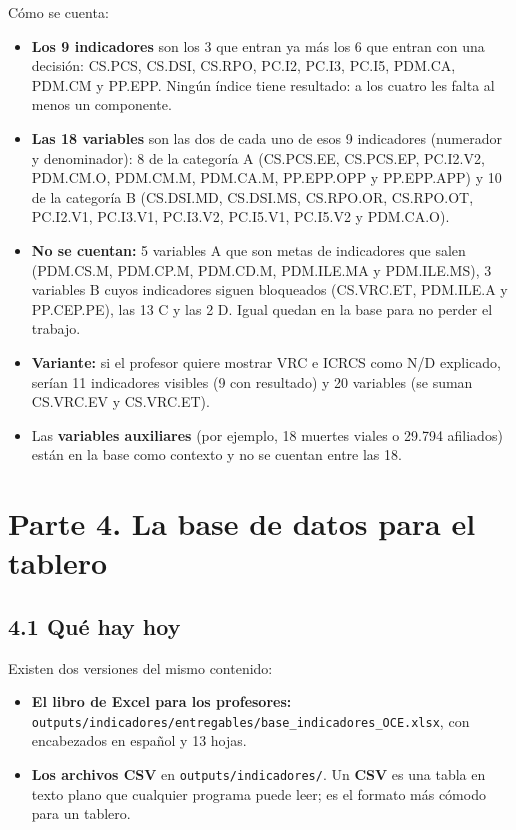 \documentclass[11pt,letterpaper]{article}
\begin{document}
Cómo se cuenta:

\begin{itemize}
\item \textbf{Los 9 indicadores} son los 3 que entran ya más los 6 que entran con una decisión: CS.PCS, CS.DSI, CS.RPO, PC.I2, PC.I3, PC.I5, PDM.CA, PDM.CM y PP.EPP. Ningún índice tiene resultado: a los cuatro les falta al menos un componente.
\item \textbf{Las 18 variables} son las dos de cada uno de esos 9 indicadores (numerador y denominador): 8 de la categoría A (CS.PCS.EE, CS.PCS.EP, PC.I2.V2, PDM.CM.O, PDM.CM.M, PDM.CA.M, PP.EPP.OPP y PP.EPP.APP) y 10 de la categoría B (CS.DSI.MD, CS.DSI.MS, CS.RPO.OR, CS.RPO.OT, PC.I2.V1, PC.I3.V1, PC.I3.V2, PC.I5.V1, PC.I5.V2 y PDM.CA.O).
\item \textbf{No se cuentan:} 5 variables A que son metas de indicadores que salen (PDM.CS.M, PDM.CP.M, PDM.CD.M, PDM.ILE.MA y PDM.ILE.MS), 3 variables B cuyos indicadores siguen bloqueados (CS.VRC.ET, PDM.ILE.A y PP.CEP.PE), las 13 C y las 2 D. Igual quedan en la base para no perder el trabajo.
\item \textbf{Variante:} si el profesor quiere mostrar VRC e ICRCS como N/D explicado, serían 11 indicadores visibles (9 con resultado) y 20 variables (se suman CS.VRC.EV y CS.VRC.ET).
\item Las \textbf{variables auxiliares} (por ejemplo, 18 muertes viales o 29.794 afiliados) están en la base como contexto y no se cuentan entre las 18.
\end{itemize}

\clearpage

\section*{Parte 4. La base de datos para el tablero}


\subsection*{4.1 Qué hay hoy}


Existen dos versiones del mismo contenido:

\begin{itemize}
\item \textbf{El libro de Excel para los profesores:} \texttt{\footnotesize outputs/\allowbreak{}indicadores/\allowbreak{}entregables/\allowbreak{}base\_\allowbreak{}indicadores\_\allowbreak{}OCE.\allowbreak{}xlsx}, con encabezados en español y 13 hojas.
\item \textbf{Los archivos CSV} en \texttt{\footnotesize outputs/\allowbreak{}indicadores/\allowbreak{}}. Un \textbf{CSV} es una tabla en texto plano que cualquier programa puede leer; es el formato más cómodo para un tablero.
\end{itemize}
\end{document}
